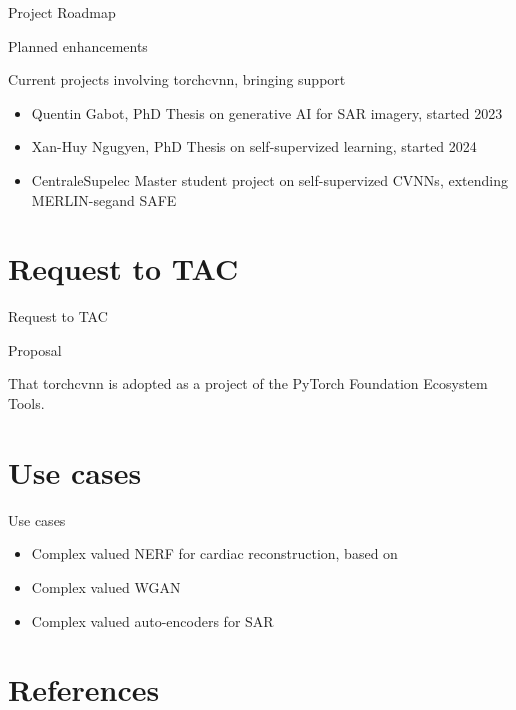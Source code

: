 \documentclass[aspectratio=169,10pt]{beamer}
\begin{document}
\begin{frame}{Project Roadmap}

\begin{block}{Planned enhancements}
\end{block}

\begin{block}{Current projects involving torchcvnn, bringing support}

\begin{itemize}
\item Quentin Gabot, PhD Thesis on generative AI for SAR imagery, started 2023
\item Xan-Huy Ngugyen, PhD Thesis on self-supervized learning, started 2024
\item CentraleSupelec Master student project on self-supervized CVNNs, extending MERLIN-seg\cite{Dalasso2024}and SAFE \cite{Muzeau2024}
\end{itemize}

\end{block}

\end{frame}

\section{Request to TAC}
\begin{frame}{Request to TAC}

\begin{block}{Proposal}

That torchcvnn is adopted as a project of the PyTorch Foundation Ecosystem Tools.
\end{block}

\end{frame}


\section{Use cases}

\begin{frame}{Use cases}

\begin{itemize}
\item Complex valued NERF for cardiac reconstruction, based on \cite{Hemidi2023}
\item Complex valued WGAN \cite{Dhedin2024}
\item Complex valued auto-encoders for SAR \cite{Gabot2024}
\end{itemize}

\end{frame}

\section{References}



\end{document}
